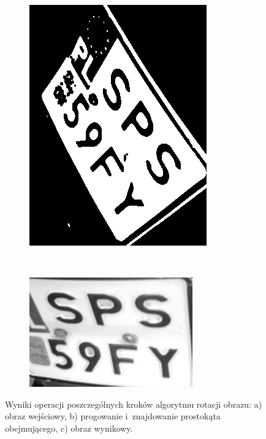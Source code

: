 \begin{figure}
\begin{subfigure}[b]{0.45\textwidth}
    \includegraphics[width=\textwidth]{img/detect-image-angle-threshold}
    \label{fig:rzut_liczba_linii_dwa}
    \caption{}
  \end{subfigure}
  ~
  \begin{subfigure}[b]{0.45\textwidth}
    \includegraphics[width=\textwidth]{img/detect-image-angle-output}
    \label{fig:rzut_liczba_linii_dwa}
    \caption{}
  \end{subfigure}
  \caption{Wyniki operacji poszczególnych kroków algorytmu rotacji obrazu: a) obraz wejściowy, b) progowanie i~znajdowanie prostokąta obejmującego, c) obraz wynikowy.}
  \label{fig:detect_image_angle}
\end{figure}


